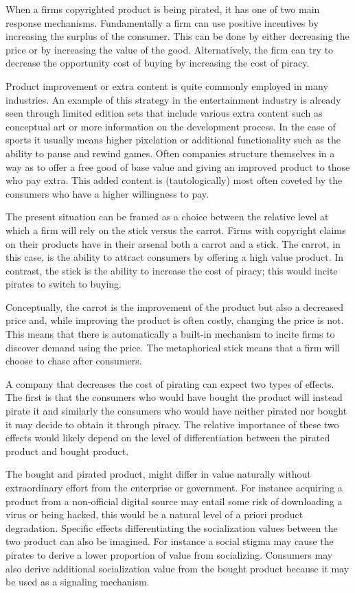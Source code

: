 \documentclass{article}
\begin{document}
When a firms copyrighted product is being pirated, it has one of two main response mechanisms. Fundamentally a firm can use positive incentives by increasing the surplus of the consumer. This can be done by either decreasing the price or by increasing the value of the good. Alternatively, the firm can try to decrease the opportunity cost of buying by increasing the cost of piracy.  

Product improvement or extra content is quite commonly employed in many industries. An example of this strategy in the entertainment industry is already seen through limited edition sets that include various extra content such as conceptual art or more information on the development process. In the case of sports it usually means higher pixelation or additional functionality such as the ability to pause and rewind games. Often companies structure themselves in a way as to offer a free good of base value and giving an improved product to those who pay extra. This added content is (tautologically) most often coveted by the consumers who have a higher willingness to pay.

The present situation can be framed as a choice between the relative level at which a firm will rely on the stick versus the carrot. Firms with copyright claims on their products have in their arsenal both a carrot and a stick. The carrot, in this case, is the ability to attract consumers by offering a high value product. In contrast, the stick is the ability to increase the cost of piracy; this would incite pirates to switch to buying. 

Conceptually, the carrot is the improvement of the product but also a decreased price and, while improving the product is often costly, changing the price is not. This means that there is automatically a built-in mechanism to incite firms to discover demand using the price. The metaphorical stick means that a firm will choose to chase after consumers. 

A company that decreases the cost of pirating can expect two types of effects. The first is that the consumers who would have bought the product will instead pirate it and similarly the consumers who would have neither pirated nor bought it may decide to obtain it through piracy. The relative importance of these two effects would likely depend on the level of differentiation between the pirated product and bought product.

The bought and pirated product, might differ in value naturally without extraordinary effort from the enterprise or government. For instance acquiring a product from a non-official digital source may entail some risk of downloading a virus or being hacked, this would be a natural level of a priori product degradation. Specific effects differentiating the socialization values between the two product can also be imagined. For instance a social stigma may cause the pirates to derive a lower proportion of value from socializing. Consumers may also derive additional socialization value from the bought product because it may be used as a signaling mechanism.
\end{document}
